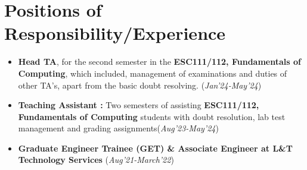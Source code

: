 \documentclass[10.8pt, a4paper]{extarticle}
\newcommand{\shorterSection}[1]{\vspace{-10pt}\section{#1}}
\begin{document}
\vspace{6mm}


\shorterSection{Positions of Responsibility/Experience}
\begin{itemize}

\item \textbf{Head TA}, for the second semester in the \textbf{ESC111/112, Fundamentals of Computing}, which included, management of examinations and duties of other TA's, apart from the basic doubt resolving. \hfill\hfill(\textit{Jan'24-May'24})  \\[0.15cm]

\item \textbf{Teaching Assistant :} Two semesters of assisting \textbf{ESC111/112, Fundamentals of Computing} students with doubt resolution, lab test management and grading assignments\hfill\hfill(\textit{Aug'23-May'24})  \\[0.15cm]


\item \textbf{Graduate Engineer Trainee (GET) \& Associate Engineer at L\&T Technology Services } \href{https://drive.google.com/file/d/1OrfxyGyHMvoRFeCne3UPIx8iQgQaKPqk/view?usp=sharing}{\faLink{}} \href{https://drive.google.com/file/d/1JMF9GNNZ7MU2pVo0j9vEk110BOJtHZgV/view?usp=sharing}{\faLink{}} \hfill\hfill(\textit{Aug'21-March'22})  \\[-0.6cm]

\vspace{4mm}
\end{itemize}
\vspace{4mm}

\end{document}
